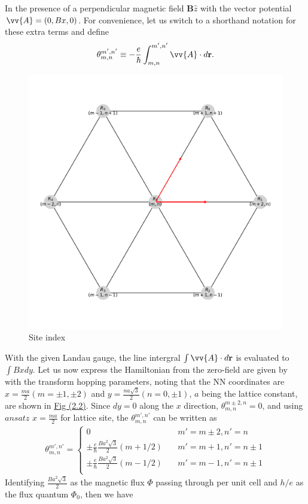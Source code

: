 \documentclass{report}
\newcommand{\f}[2]{\dfrac{#1}{#2}}
\begin{document}
In the presence of a perpendicular magnetic field $\mathbf{B} \hat{z}$ with the vector potential $\vv{A} = (0, Bx, 0)$. For convenience, let us switch to a shorthand notation for these extra terms and define
\begin{gather}
	\theta_{m,n}^{m',n'} \equiv - \f{e}{\hbar} \int_{m,n}^{m',n'} \vv{A} \cdot d\mathbf{r}.
\end{gather}
\begin{figure}[H]
	\centering
	\includegraphics[width=0.5\linewidth,height=0.5\linewidth]{pic/siteindice.pdf}
	\caption{\label{fig:site index} Site index}
\end{figure}
With the given Landau gauge, the line intergral $\int \vv{A} \cdot d\mathbf{r}$ is evaluated to $\int Bx dy$. Let us now express the Hamiltonian from the zero-field are given by \cite{PhysRevB.88.085433} with the transform hopping parameters, noting that the NN coordinates are $x = \frac{ma}{2}(m = \pm 1, \pm 2)$ and $y = \frac{na\sqrt{3}}{2}(n = 0,\pm 1)$, $a$ being the lattice constant, are shown in \hyperref[fig:site index]{Fig (2.2)}. Since $dy = 0$ along the $x$ direction, $\theta_{m,n}^{m \pm 2, n} = 0$, and using $ansatz$ $x = \frac{ma}{2}$ for lattice site, the $\theta_{m,n}^{m',n'}$ can be written as
\begin{gather}
	\theta_{m,n}^{m',n'} =
	\begin{cases}
		0                                                         & \quad m' = m \pm 2, n' = n     \\
		\pm \frac{e}{\hbar} \frac{B a^{2} \sqrt{3}}{2} (m + 1 /2) & \quad m' = m + 1, n' = n \pm 1 \\
		\pm \frac{e}{\hbar} \frac{B a^{2} \sqrt{3}}{2} (m - 1 /2) & \quad m' = m - 1, n' = n \pm 1 \\
	\end{cases}
\end{gather}
Identifying $\frac{B a^{2} \sqrt{3}}{2}$ as the magnetic flux $\Phi$ passing through per unit cell and $h / e$ as the flux quantum $\Phi_{0}$, then we have
\end{document}
